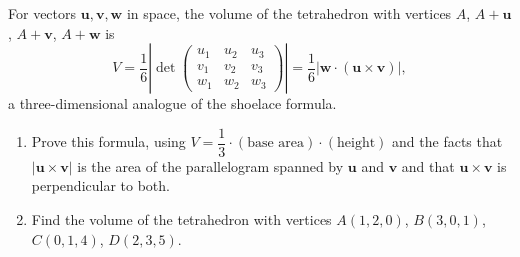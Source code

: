 For vectors $\mathbf u,\mathbf v,\mathbf w$ in space, the volume of the tetrahedron with vertices $A$, $A+\mathbf u$, $A+\mathbf v$, $A+\mathbf w$ is
\[
V=\dfrac{1}{6}\left|\det\begin{pmatrix}u_1&u_2&u_3\\ v_1&v_2&v_3\\ w_1&w_2&w_3\end{pmatrix}\right|=\dfrac{1}{6}\left|\mathbf w\cdot(\mathbf u\times\mathbf v)\right|,
\]
a three-dimensional analogue of the shoelace formula.
\begin{enumerate}
\item[(a)] Prove this formula, using $V=\dfrac{1}{3}\cdot(\text{base area})\cdot(\text{height})$ and the facts that $|\mathbf u\times\mathbf v|$ is the area of the parallelogram spanned by $\mathbf u$ and $\mathbf v$ and that $\mathbf u\times\mathbf v$ is perpendicular to both.
\item[(b)] Find the volume of the tetrahedron with vertices $A(1,2,0)$, $B(3,0,1)$, $C(0,1,4)$, $D(2,3,5)$.
\end{enumerate}
